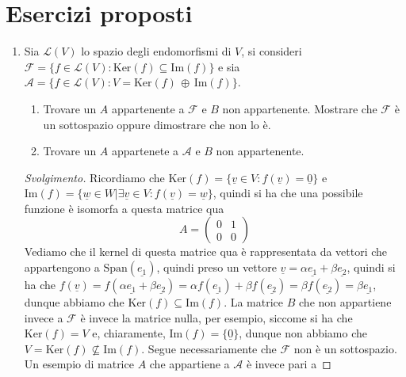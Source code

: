 \section*{Esercizi proposti}

\begin{enumerate}
  \item Sia $\mathcal{L}(V)$ lo spazio degli endomorfismi di $V$, si consideri $\mathcal{F} = \{ f \in \mathcal{L}(V) : \text{Ker}(f) \subseteq \text{Im}(f) \}$ e sia $\mathcal{A} = \{ f \in \mathcal{L}(V) : V = \text{Ker}(f) \, \oplus \, \text{Im}(f) \}$.
  \begin{enumerate}
    \item Trovare un $A$ appartenente a $\mathcal{F}$ e $B$ non appartenente. Mostrare che $\mathcal{F}$ è un sottospazio oppure dimostrare che non lo è.
    \item Trovare un $A$ appartenete a $\mathcal{A}$ e $B$ non appartenente.
  \end{enumerate}
  \begin{proof}[Svolgimento]
    Ricordiamo che $\text{Ker}(f) = \{ \underline{v} \in V : f(\underline{v}) = \underline{0} \}$ e $\text{Im}(f) = \{ \underline{w} \in W \big| \exists \underline{v} \in V : f(\underline{v}) = \underline{w} \}$, quindi si ha
    che una possibile funzione è isomorfa a questa matrice qua
    \begin{equation*}
      A = \begin{pmatrix}
          0 & 1 \\
          0 & 0
      \end{pmatrix}
    \end{equation*}
    Vediamo che il kernel di questa matrice qua è rappresentata da vettori che appartengono a $\text{Span}(\underline{e_1})$, quindi preso un vettore $\underline{v} = \alpha \underline{e_1} + \beta \underline{e_2}$, quindi si ha che
    $f(\underline{v}) = f(\alpha \underline{e_1} + \beta \underline{e_2}) = \alpha f(\underline{e_1}) + \beta f(\underline{e_2}) = \beta f(\underline{e_2}) = \beta \underline{e_1}$, dunque abbiamo che $\text{Ker}(f)  \subseteq \text{Im}(f)$.
    La matrice $B$ che non appartiene invece a $\mathcal{F}$ è invece la matrice nulla, per esempio, siccome si ha che $\text{Ker}(f) = V$ e, chiaramente, $\text{Im}(f) = \{ \underline{0} \}$, dunque non abbiamo che $V = \text{Ker}(f) \not\subseteq \text{Im}(f)$. Segue necessariamente che $\mathcal{F}$ non è un sottospazio. \\
    Un esempio di matrice $A$ che appartiene a $\mathcal{A}$ è invece pari a

\end{proof}
\end{enumerate}
